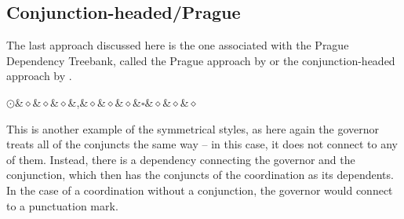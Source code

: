 \subsection{Conjunction-headed/Prague}
The last approach discussed here is the one associated with the Prague Dependency Treebank, called the Prague approach by \cite{popel2013coordination} or the conjunction-headed approach by \cite{prz:woz:23}.

\begin{exe}
\centering
\ex\label{ex:prague}
\begin{dependency}[theme = simple, baseline=-\the\dimexpr\fontdimen22\textfont2\relax]
            \begin{deptext}
    $\odot$\&$\diamond$\&$\diamond$\&$\diamond$\&,\&$\diamond$\&$\diamond$\&$\diamond$\&$\square$\&$\diamond$\&$\diamond$\&$\diamond$\\
            \end{deptext}
        \end{dependency}
\end{exe}

This is another example of the symmetrical styles, as here again the governor treats all of the conjuncts the same way -- in this case, it does not connect to any of them. Instead, there is a dependency connecting the governor and the conjunction, which then has the conjuncts of the coordination as its dependents. In the case of a coordination without a conjunction, the governor would connect to a punctuation mark. 

